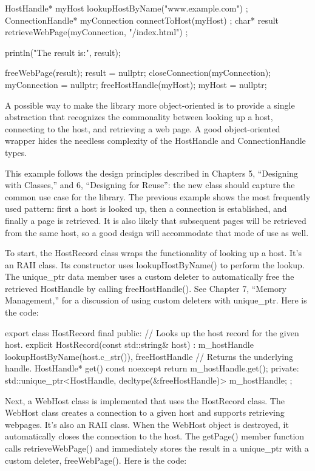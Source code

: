 \begin{cpp}
HostHandle* myHost { lookupHostByName("www.example.com") };
ConnectionHandle* myConnection { connectToHost(myHost) };
char* result { retrieveWebPage(myConnection, "/index.html") };

println("The result is:\n{}", result);

freeWebPage(result); result = nullptr;
closeConnection(myConnection); myConnection = nullptr;
freeHostHandle(myHost); myHost = nullptr;
\end{cpp}

A possible way to make the library more object-oriented is to provide a single abstraction that recognizes the commonality between looking up a host, connecting to the host, and retrieving a web page. A good object-oriented wrapper hides the needless complexity of the HostHandle and ConnectionHandle types.

This example follows the design principles described in Chapters 5, “Designing with Classes,” and 6, “Designing for Reuse”: the new class should capture the common use case for the library. The previous example shows the most frequently used pattern: first a host is looked up, then a connection is established, and finally a page is retrieved. It is also likely that subsequent pages will be retrieved from the same host, so a good design will accommodate that mode of use as well.

To start, the HostRecord class wraps the functionality of looking up a host. It’s an RAII class. Its constructor uses lookupHostByName() to perform the lookup. The unique\_ptr data member uses a custom deleter to automatically free the retrieved HostHandle by calling freeHostHandle(). See Chapter 7, “Memory Management,” for a discussion of using custom deleters with unique\_ptr. Here is the code:

\begin{cpp}
export class HostRecord final
{
    public:
        // Looks up the host record for the given host.
        explicit HostRecord(const std::string& host)
            : m_hostHandle { lookupHostByName(host.c_str()), freeHostHandle }
        { }
        // Returns the underlying handle.
        HostHandle* get() const noexcept { return m_hostHandle.get(); }
    private:
        std::unique_ptr<HostHandle, decltype(&freeHostHandle)> m_hostHandle;
};
\end{cpp}

Next, a WebHost class is implemented that uses the HostRecord class. The WebHost class creates a connection to a given host and supports retrieving webpages. It’s also an RAII class. When the WebHost object is destroyed, it automatically closes the connection to the host. The getPage() member function calls retrieveWebPage() and immediately stores the result in a unique\_ptr with a custom deleter, freeWebPage(). Here is the code:

